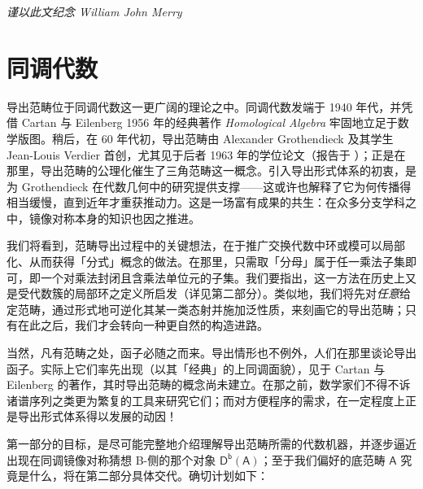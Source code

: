\hfill\textit{谨以此文纪念 William John Merry}



\newpage



\part{同调代数}
\thispagestyle{plain}


\vspace*{2cm}


\noindent 导出范畴位于同调代数这一更广阔的理论之中。同调代数发端于 1940 年代，并凭借 Cartan 与 Eilenberg 1956 年的经典著作 \textit{Homological Algebra} 牢固地立足于数学版图。稍后，在 60 年代初，导出范畴由 Alexander Grothendieck 及其学生 Jean-Louis Verdier 首创，尤其见于后者 1963 年的学位论文（报告于 \cite{[Ver96]}）；正是在那里，导出范畴的公理化催生了三角范畴这一概念。引入导出形式体系的初衷，是为 Grothendieck 在代数几何中的研究提供支撑——这或许也解释了它为何传播得相当缓慢，直到近年才重获推动力。这是一场富有成果的共生：在众多分支学科之中，镜像对称本身的知识也因之推进。

我们将看到，范畴导出过程中的关键想法，在于推广交换代数中环或模可以局部化、从而获得「分式」概念的做法。在那里，只需取「分母」属于任一乘法子集即可，即一个对乘法封闭且含乘法单位元的子集。我们要指出，这一方法在历史上又是受代数簇的局部环之定义所启发（详见第二部分）。类似地，我们将先对\textit{任意}给定范畴，通过形式地可逆化其某一类态射并施加泛性质，来刻画它的导出范畴；只有在此之后，我们才会转向一种更自然的构造进路。

当然，凡有范畴之处，函子必随之而来。导出情形也不例外，人们在那里谈论导出函子。实际上它们率先出现（以其「经典」的上同调面貌），见于 Cartan 与 Eilenberg 的著作，其时导出范畴的概念尚未建立。在那之前，数学家们不得不诉诸谱序列之类更为繁复的工具来研究它们；而对方便程序的需求，在一定程度上正是导出形式体系得以发展的动因！

第一部分的目标，是尽可能完整地介绍理解导出范畴所需的代数机器，并逐步逼近出现在同调镜像对称猜想 B-侧的那个对象 $\mathsf{D^b}(\mathsf{A})$；至于我们偏好的底范畴 $\mathsf{A}$ 究竟是什么，将在第二部分具体交代。确切计划如下：

